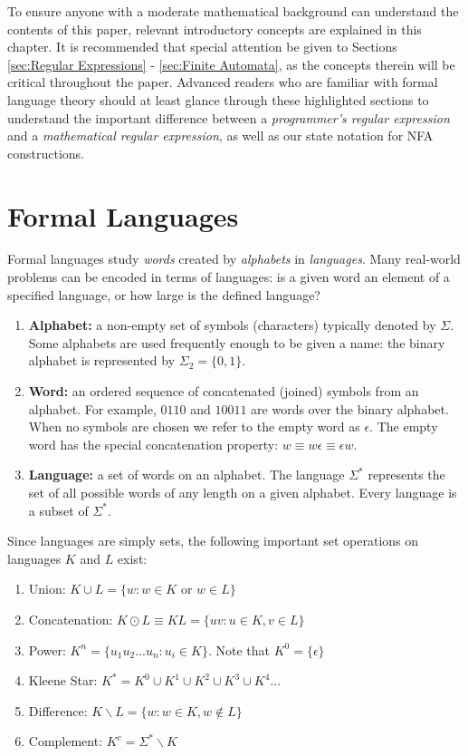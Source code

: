 To ensure anyone with a moderate mathematical background can understand the contents of this paper, relevant introductory concepts are explained in this chapter. It is recommended that special attention be given to Sections \ref{sec:Regular Expressions} - \ref{sec:Finite Automata}, as the concepts therein will be critical throughout the paper. Advanced readers who are familiar with formal language theory should at least glance through these highlighted sections to understand the important difference between a \emph{programmer's regular expression} and a \emph{mathematical regular expression}, as well as our state notation for NFA constructions.





\section{Formal Languages}
\label{sec:Formal Languages}
Formal languages study \emph{words} created by \emph{alphabets} in \emph{languages}. Many real-world problems can be encoded in terms of languages: is a given word an element of a specified language, or how large is the defined language?
\begin{enumerate}
  \item {\bf Alphabet:} a non-empty set of symbols (characters) typically denoted by $\Sigma$. Some alphabets are used frequently enough to be given a name: the binary alphabet is represented by $\Sigma_2 = \{0, 1\}$.
  \item {\bf Word:} an ordered sequence of concatenated (joined) symbols from an alphabet. For example, $0110$ and $10011$ are words over the binary alphabet. When no symbols are chosen we refer to the empty word as $\epsilon$. The empty word has the special concatenation property: $w \equiv w\epsilon \equiv \epsilon w$.
  \item {\bf Language:} a set of words on an alphabet. The language $\Sigma^*$ represents the set of all possible words of any length on a given alphabet. Every language is a subset of $\Sigma^*$.
\end{enumerate}
Since languages are simply sets, the following important set operations on languages $K$ and $L$ exist:
\begin{enumerate}
  \item Union: $K \cup L = \{w : w \in K $ or $ w \in L\}$
  \item Concatenation: $K \odot L \equiv KL = \{uv : u \in K, v \in L\}$
  \item Power: $K^n = \{u_1 u_2 ... u_n : u_i \in K\}$. Note that $K^0 = \{\epsilon\}$
  \item Kleene Star: $K^* = K^0 \cup K^1 \cup K^2 \cup K^3 \cup K^4 ...$
  \item Difference: $K \backslash L = \{w : w \in K, w \notin L\}$
  \item Complement: $K^c = \Sigma^* \backslash K$
\end{enumerate}






